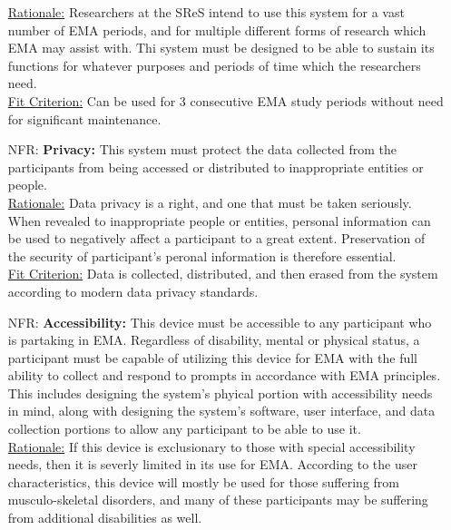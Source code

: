 \documentclass[12pt]{article}
\newcounter{nfrnum} %
\begin{document}
\begin{itemize}
\underline{Rationale:} Researchers at the SReS intend to use this system for a vast number of EMA periods, and for multiple different forms of research which EMA may assist with. Thi system must be designed to be able to sustain its functions for whatever purposes and periods of time which the researchers need.\\

\underline{Fit Criterion:} Can be used for 3 consecutive EMA study periods without need for significant maintenance.\\

\item[NFR\refstepcounter{nfrnum}\thenfrnum \label{NFR_Privacy}:]
  \textbf{Privacy:} This system must protect the data collected from the participants from being accessed or distributed to inappropriate entities or people. \\


\underline{Rationale:} Data privacy is a right, and one that must be taken seriously. When revealed to inappropriate people or entities, personal information can be used to negatively affect a participant to a great extent. Preservation of the security of participant's peronal information is therefore essential.\\

\underline{Fit Criterion:} Data is collected, distributed, and then erased from the system according to modern data privacy standards.\\

\item[NFR\refstepcounter{nfrnum}\thenfrnum \label{NFR_Accessibility}:]
  \textbf{Accessibility:} This device must be accessible to any participant who is partaking in EMA. Regardless of disability, mental or physical status, a participant must be capable of utilizing this device for EMA with the full ability to collect and respond to prompts in accordance with EMA principles. This includes designing the system's phyical portion with accessibility needs in mind, along with designing the system's software, user interface, and data collection portions to allow any participant to be able to use it.\\

\underline{Rationale:} If this device is exclusionary to those with special accessibility needs, then it is severly limited in its use for EMA. According to the user characteristics, this device will mostly be used for those suffering from musculo-skeletal disorders, and many of these participants may be suffering from additional disabilities as well.\\


\end{itemize}
\end{document}
